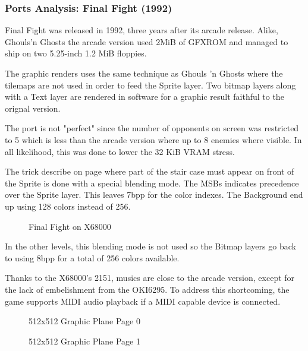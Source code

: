 \pagebreak

\subsubsection{Ports Analysis: Final Fight (1992)}

Final Fight was released in 1992, three years after its arcade release. Alike, Ghouls'n Ghosts the arcade version used 2MiB of GFXROM and managed to ship on two 5.25-inch 1.2 MiB floppies.

The graphic renders uses the same technique as Ghouls 'n Ghosts where the tilemaps are not used in order to feed the Sprite layer. Two bitmap layers along with a Text layer are rendered in software for a graphic result faithful to the orignal version.

The port is not "perfect" since the number of opponents on screen was restricted to 5 which is less than the arcade version where up to 8 enemies where visible. In all likelihood, this was done to lower the 32 KiB VRAM stress.

The trick describe on page \pageref{finalfight_trick} where part of the stair case must appear on front of the Sprite is done with a special blending mode. The MSBs indicates precedence over the Sprite layer. This leaves 7bpp for the color indexes. The Background end up using 128 colors instead of 256.

\begin{figure}[H]
\caption*{Final Fight on X68000}
\end{figure}


In the other levels, this blending mode is not used so the Bitmap layers go back to using 8bpp for a total of 256 colors available.

Thanks to the X68000's 2151, musics are close to the arcade version, except for the lack of embelishment from the OKI6295. To address this shortcoming, the game supports MIDI audio playback if a MIDI capable device is connected.

\vspace{-4ex}
\begin{minipage}[t]{0.49\linewidth}
  \begin{figure}[H]
  \caption*{512x512 Graphic Plane Page 0}
  \end{figure}
\end{minipage}%
\hfill
\begin{minipage}[t]{0.49\linewidth}
  \begin{figure}[H]
  \caption*{512x512 Graphic Plane Page 1}
  \end{figure}
\end{minipage}%

